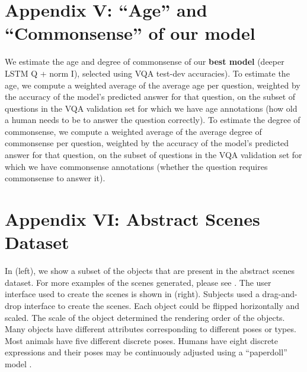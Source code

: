 \section*{Appendix V: ``Age'' and ``Commonsense'' of our model}
\label{sec:model_age}
We estimate the age and degree of commonsense of our \textbf{best model} (deeper LSTM Q + norm I), selected using VQA test-dev accuracies). To estimate the age, we compute a weighted average of the average age per question, weighted by the accuracy of the model's predicted answer for that question, on the subset of questions in the VQA validation set for which we have age annotations (how old a human needs to be to answer the question correctly). To estimate the degree of commonsense, we compute a weighted average of the average degree of commonsense per question, weighted by the accuracy of the model's predicted answer for that question, on the subset of questions in the VQA validation set for which we have commonsense annotations (whether the question requires commonsense to answer it).


\section*{Appendix VI: Abstract Scenes Dataset}
\label{sec:abstract_scenes}
In  (left), we show a subset of the objects that are present in the abstract scenes dataset. For more examples of the scenes generated, please see . The user interface used to create the scenes is shown in  (right). Subjects used a drag-and-drop interface to create the scenes. Each object could be flipped horizontally and scaled. The scale of the object determined the rendering order of the objects. Many objects have different attributes corresponding to different poses or types. Most animals have five different discrete poses. Humans have eight discrete expressions and their poses may be continuously adjusted using a ``paperdoll'' model \cite{Antol2014}.

